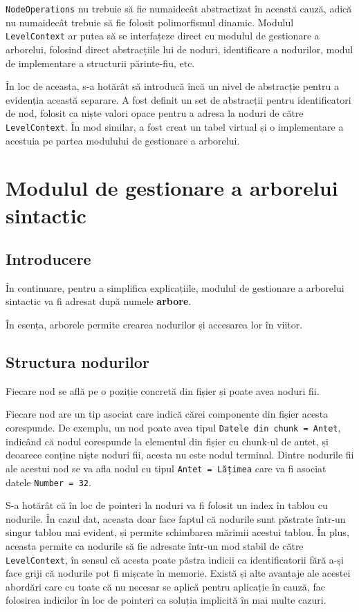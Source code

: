 \documentclass[a4paper,12pt]{report}
\begin{document}
\texttt{NodeOperations} nu trebuie să fie numaidecât abstractizat în această cauză,
adică nu numaidecât trebuie să fie folosit polimorfismul dinamic.
Modulul \texttt{LevelContext} ar putea să se interfațeze direct cu modulul de gestionare a arborelui,
folosind direct abstracțiile lui de noduri, identificare a nodurilor,
modul de implementare a structurii părinte-fiu, etc.

În loc de aceasta, s-a hotărât să introducă încă un nivel de abstracție pentru a evidenția această separare.
A fost definit un set de abstracții pentru identificatori de nod,
folosit ca niște valori opace pentru a adresa la noduri de către \texttt{LevelContext}.
În mod similar, a fost creat un tabel virtual și o implementare a acestuia pe partea modulului de gestionare a arborelui.

\section{Modulul de gestionare a arborelui sintactic}

\subsection{Introducere}

În continuare, pentru a simplifica explicațiile,
modulul de gestionare a arborelui sintactic va fi adresat după numele \textbf{arbore}.

În esența, arborele permite crearea nodurilor și accesarea lor în viitor.

\subsection{Structura nodurilor}

Fiecare nod se află pe o poziție concretă din fișier și poate avea noduri fii.

Fiecare nod are un tip asociat care indică cărei componente din fișier acesta corespunde.
De exemplu, un nod poate avea tipul \texttt{Datele din chunk = Antet},
indicând că nodul corespunde la elementul din fișier cu chunk-ul de antet,
și deoarece conține niște noduri fii, acesta nu este nodul terminal.
Dintre nodurile fii ale acestui nod se va afla nodul cu tipul \texttt{Antet = Lățimea}
care va fi asociat datele \texttt{Number = 32}.

S-a hotărât că în loc de pointeri la noduri va fi folosit un index în tablou cu nodurile.
În cazul dat, aceasta doar face faptul că nodurile sunt păstrate într-un singur tablou mai evident,
și permite schimbarea mărimii acestui tablou.
În plus, aceasta permite ca nodurile să fie adresate într-un mod stabil de către \texttt{LevelContext},
în sensul că acesta poate păstra indicii ca identificatorii fără a-și face griji că nodurile pot fi mișcate în memorie.
Există și alte avantaje ale acestei abordări care cu toate că nu necesar se aplică pentru aplicație în cauză,
fac folosirea indicilor în loc de pointeri ca soluția implicită în mai multe cazuri.
\end{document}
